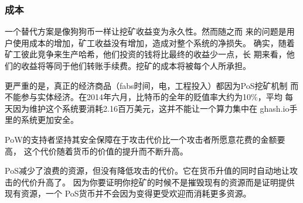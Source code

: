 \documentclass[letterpaper]{article}
\begin{document}
\subsubsection{成本}
一个替代方案是像狗狗币\cite{doge}一样让挖矿收益变为永久性。然而随之而
来的问题是用户使用成本的增加，矿工收益没有增加，造成对整个系统的净损失。
确实，随着矿工彼此竞争来生产哈希，他们投资的钱将比最终的收益少一点，长
期来看，他们的收益将等同于他们转账手续费。挖矿的成本将被每个人所承担。

更严重的是，真正的经济商品（fabs时间，电，工程投入）都因为PoS挖矿机制
而不能参与实体经济。在2014年六月，比特币的全年的贬值率大约为10\%，平均
每天因为维护这个系统要消耗2.16百万美元，这并不能让一个算力集中在
ghash.io手里的系统更加安全。

PoW的支持者坚持其安全保障在于攻击代价比一个攻击者所愿意花费的金额要高，
这个代价随着货币的价值的提升而不断升高。

PoS减少了浪费的资源，但没有降低攻击的代价。它在货币升值的同时自动地让攻击的代价升高了。
因为你要证明你挖矿的时候不是摧毁现有的资源而是证明提供现有资源，一个
PoS货币并不会因为变得更受欢迎而消耗更多资源。
\end{document}

